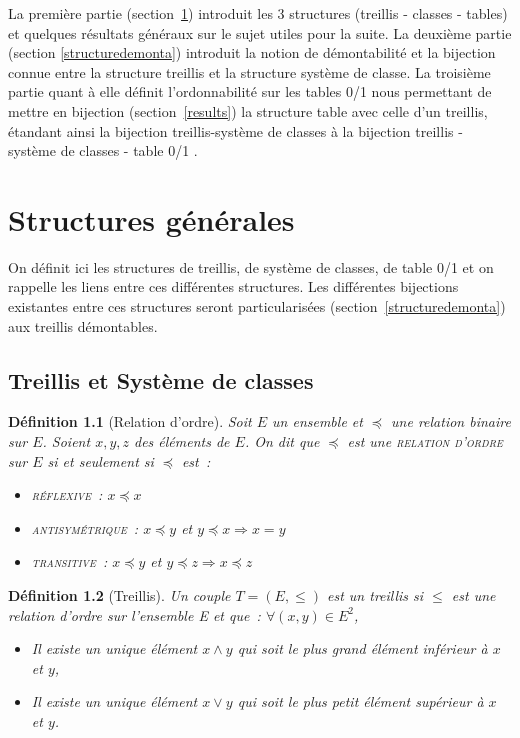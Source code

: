 \documentclass[a4paper]{report}
\newcommand{\meet}{\wedge}
\newcommand{\join}{\vee}
\newtheorem{definition}{Définition}[chapter]
\begin{document}
La première partie (section~\ref{gene}) introduit les 3 structures (treillis - classes - tables) et quelques résultats généraux sur le sujet utiles pour la suite.
La deuxième partie (section \ref{structuredemonta}) introduit la notion de démontabilité et la bijection connue entre la structure treillis et la structure système de classe.
La troisième  partie quant à elle définit l'ordonnabilité sur les tables 0/1 nous permettant de mettre en bijection (section~\ref{results}) la structure table avec celle d'un treillis,  
étandant ainsi la bijection treillis-système de classes à la bijection
treillis - système de classes - table 0/1 .

\chapter{Structures générales}

\label{gene}

On définit ici les structures de treillis, de système de classes, de table 0/1 et on rappelle les liens entre ces différentes structures.
Les différentes bijections existantes entre ces structures seront particularisées (section~\ref{structuredemonta}) aux treillis démontables.

\section{Treillis et Système de classes}

\begin{definition}[Relation d'ordre]

Soit $E$ un ensemble et $\preccurlyeq$ une relation binaire sur $E$.
Soient $x, y, z$ des éléments de $E$.
On dit que $\preccurlyeq$ est une \textsc{relation d'ordre} sur $E$ si et seulement si $\preccurlyeq$ est~:
\begin{itemize}
 \item \textsc{réflexive}~: $x \preccurlyeq x$ 
 \item \textsc{antisymétrique}~: $x \preccurlyeq y$ et $y \preccurlyeq x \Rightarrow x = y$
 \item \textsc{transitive}~: $x \preccurlyeq y$ et $y \preccurlyeq z \Rightarrow x \preccurlyeq z$ 
\end{itemize}

\end{definition}

\begin{definition}[Treillis] 

Un couple $T = (E, \leq)$ est un treillis si $\leq$ est une relation d'ordre sur l'ensemble E et que~:
$\forall (x, y) \in E^2$,

\begin{itemize}
\item Il existe un unique élément $x \meet y$ qui soit le plus grand élément inférieur à $x$ et $y$,
\item Il existe un unique élément $x \join y$ qui soit le plus petit élément supérieur à $x$ et $y$.
\end{itemize}

\end{definition}
\end{document}
